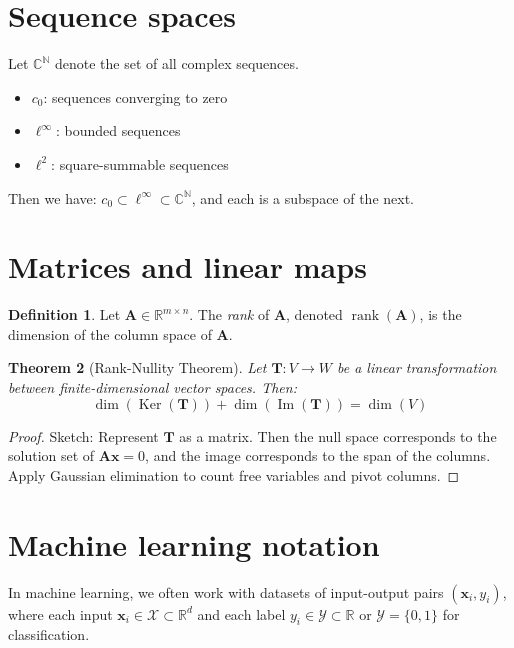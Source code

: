 \documentclass[11pt]{article}
\newcommand{\R}{\mathbb{R}}
\newcommand{\C}{\mathbb{C}}
\newcommand{\N}{\mathbb{N}}
\newcommand{\Xcal}{\mathcal{X}}  %
\newcommand{\Ycal}{\mathcal{Y}}  %
\newcommand{\vect}[1]{\bm{#1}}  %
\newcommand{\mat}[1]{\bm{#1}}   %
\DeclareMathOperator{\Ker}{Ker}
\DeclareMathOperator{\Img}{Im}
\DeclareMathOperator{\rank}{rank}
\theoremstyle{definition}
\newtheorem{definition}{Definition}[section]
\theoremstyle{plain}
\newtheorem{theorem}[definition]{Theorem}
\theoremstyle{remark}
\begin{document}
\section{Sequence spaces}

Let \( \C^\N \) denote the set of all complex sequences.

\begin{itemize}
    \item \( c_0 \): sequences converging to zero
    \item \( \ell^\infty \): bounded sequences
    \item \( \ell^2 \): square-summable sequences
\end{itemize}

Then we have: \( c_0 \subset \ell^\infty \subset \C^\N \), and each is a subspace of the next.


\section{Matrices and linear maps}

\begin{definition}
    Let \( \mat{A} \in \R^{m \times n} \). The \emph{rank} of \( \mat{A} \), denoted \( \rank(\mat{A}) \), is the
    dimension of the column space of \( \mat{A} \).
\end{definition}

\begin{theorem}[Rank-Nullity Theorem]
    Let \( \mat{T}: V \to W \) be a linear transformation between finite-dimensional vector spaces. Then:
    \[
        \dim(\Ker(\mat{T})) + \dim(\Img(\mat{T})) = \dim(V)
    \]
\end{theorem}

\begin{proof}
    Sketch: Represent \( \mat{T} \) as a matrix. Then the null space corresponds to the solution set of \(
    \mat{A}\vect{x} = 0 \), and the image corresponds to the span of the columns. Apply Gaussian elimination to count
    free variables and pivot columns.
\end{proof}


\section{Machine learning notation}

In machine learning, we often work with datasets of input-output pairs \( (\vect{x}_i, y_i) \), where each input \(
\vect{x}_i \in \Xcal \subset \R^d \) and each label \( y_i \in \Ycal \subset \R \) or \( \Ycal = \{0,1\} \) for
classification.
\end{document}
